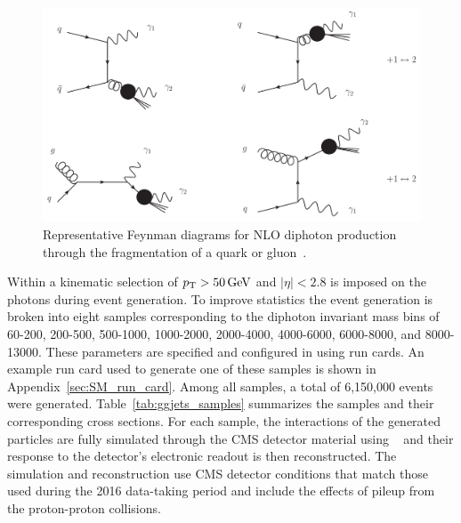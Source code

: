 \begin{figure}[!htbp]
  \centering
  \includegraphics[scale=0.45]{figures/born_frag}
  \caption{Representative Feynman diagrams for NLO diphoton production through the fragmentation of a quark or gluon~\cite{DErrico:2011cgc}.}
  \label{fig:NLO_pp_onefrag}
\end{figure}

Within \SHERPA a kinematic selection of $p_{\mathrm{T}}>50\,\text{Ge\hspace{-.08em}V}$ and $|\eta|<2.8$ is imposed on the photons during event generation. To improve statistics the event generation is broken into eight samples corresponding to the diphoton invariant mass \Mgg bins of 60-200, 200-500, 500-1000, 1000-2000, 2000-4000, 4000-6000, 6000-8000, and 8000-13000\GeV. These parameters are specified and configured in \SHERPA using run cards. An example run card used to generate one of these samples is shown in Appendix~\ref{sec:SM_run_card}. Among all samples, a total of 6,150,000 events were generated. Table~\ref{tab:ggjets_samples} summarizes the samples and their corresponding cross sections. For each sample, the interactions of the generated particles are fully simulated through the CMS detector material using \GEANTfour~\cite{Agostinelli:2002hh} and their response to the detector's electronic readout is then reconstructed. The simulation and reconstruction use CMS detector conditions that match those used during the 2016 data-taking period and include the effects of pileup from the proton-proton collisions.

